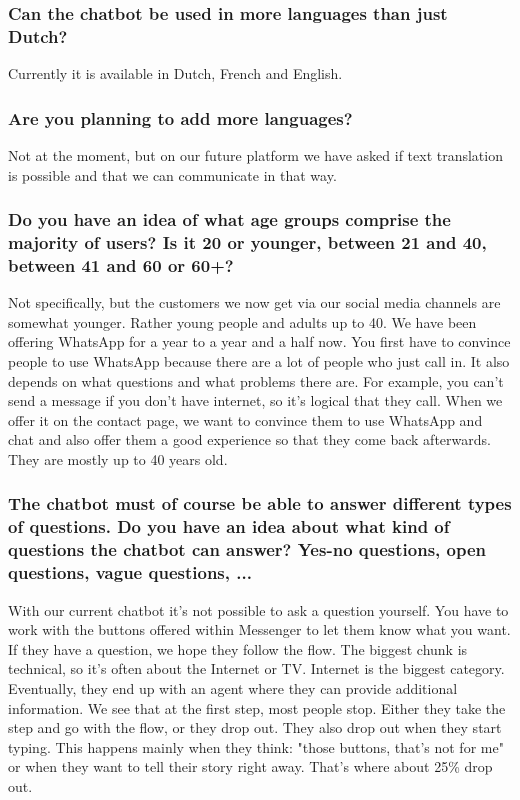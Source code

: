 \begin{appendices}
	\subsubsection{Can the chatbot be used in more languages than just Dutch?}
	Currently it is available in Dutch, French and English.
	
	\subsubsection{Are you planning to add more languages?}
	Not at the moment, but on our future platform we have asked if text translation is possible and that we can communicate in that way.
	
	\subsubsection{Do you have an idea of what age groups comprise the majority of users? Is it 20 or younger, between 21 and 40, between 41 and 60 or 60+?}
	Not specifically, but the customers we now get via our social media channels are somewhat younger. Rather young people and adults up to 40. We have been offering WhatsApp for a year to a year and a half now. You first have to convince people to use WhatsApp because there are a lot of people who just call in. It also depends on what questions and what problems there are. For example, you can't send a message if you don't have internet, so it's logical that they call. When we offer it on the contact page, we want to convince them to use WhatsApp and chat and also offer them a good experience so that they come back afterwards. They are mostly up to 40 years old.
	
	\subsubsection{The chatbot must of course be able to answer different types of questions. Do you have an idea about what kind of questions the chatbot can answer? Yes-no questions, open questions, vague questions, ...}
	With our current chatbot it's not possible to ask a question yourself. You have to work with the buttons offered within Messenger to let them know what you want. If they have a question, we hope they follow the flow. The biggest chunk is technical, so it's often about the Internet or TV. Internet is the biggest category. Eventually, they end up with an agent where they can provide additional information. We see that at the first step, most people stop. Either they take the step and go with the flow, or they drop out. They also drop out when they start typing. This happens mainly when they think: "those buttons, that's not for me" or when they want to tell their story right away. That's where about 25\% drop out.
	

\end{appendices}
